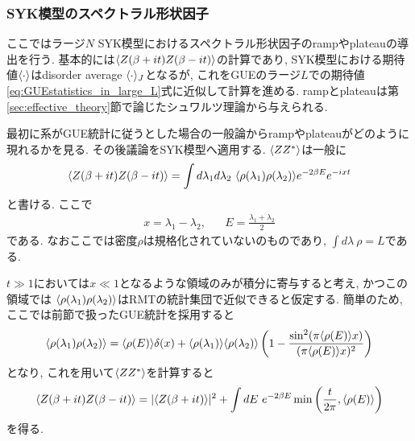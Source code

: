 \subsubsection{SYK模型のスペクトラル形状因子}
ここではラージ$N$ SYK模型におけるスペクトラル形状因子のrampやplateauの導出を行う. 
基本的には$\langle Z(\beta + it)Z(\beta - it) \rangle$の計算であり, 
SYK模型における期待値$\langle \cdot \rangle$はdisorder average $\langle \cdot \rangle_J$となるが, 
これをGUEのラージ$L$での期待値\eqref{eq:GUEstatistics_in_large_L}式に近似して計算を進める. 
rampとplateauは第\ref{sec:effective_theory}節で論じたシュワルツ理論から与えられる. 

最初に系がGUE統計に従うとした場合の一般論からrampやplateauがどのように現れるかを見る. 
その後議論をSYK模型へ適用する. 
$\langle ZZ^* \rangle$は一般に
\begin{align}
	\average{Z(\beta + it)Z(\beta - it)}
	= \int d\lambda_1d\lambda_2\ \average{\rho(\lambda_1)\rho(\lambda_2)}
		e^{-2\beta E}e^{-ixt}
\end{align}
と書ける. ここで
\begin{align}
	x = \lambda_1 - \lambda_2,\hspace{20pt}
	E = \frac{\lambda_1 + \lambda_2}{2}
\end{align}
である. 
なおここでは密度$\rho$は規格化されていないのものであり, $\int d\lambda\ \rho = L$である. 

$t \gg 1$においては$x \ll 1$となるような領域のみが積分に寄与すると考え, かつこの領域では
$\langle \rho(\lambda_1)\rho(\lambda_2) \rangle$はRMTの統計集団で近似できると仮定する. 
簡単のため, ここでは前節で扱ったGUE統計を採用すると
\begin{align}
	\langle \rho(\lambda_1)\rho(\lambda_2) \rangle
	= \langle \rho(E) \rangle\delta(x)
		+ \langle \rho(\lambda_1) \rangle\langle \rho(\lambda_2) \rangle
		\left(1 - 
			\frac{\sin^2(\pi\langle \rho(E) \rangle x)}{(\pi\langle \rho(E) \rangle x)^2}		
		\right)
\end{align}
となり, これを用いて$\langle ZZ^* \rangle$を計算すると
\begin{align}
	\langle Z(\beta + it)Z(\beta - it) \rangle
	= |\langle Z(\beta + it) \rangle|^2 + \int dE\ e^{-2\beta E}
		\min\left(\frac{t}{2\pi}, \langle \rho(E) \rangle\right)
	\label{eq:average_of_ZZ}
\end{align}
を得る. 

